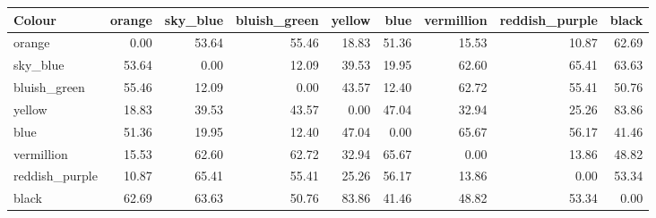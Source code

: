 \begin{tabular}{lrrrrrrrr}
\toprule
Colour & orange & sky\_blue & bluish\_green & yellow & blue & vermillion & reddish\_purple & black \\
\midrule
orange & 0.00 & 53.64 & 55.46 & 18.83 & 51.36 & 15.53 & 10.87 & 62.69 \\
sky\_blue & 53.64 & 0.00 & 12.09 & 39.53 & 19.95 & 62.60 & 65.41 & 63.63 \\
bluish\_green & 55.46 & 12.09 & 0.00 & 43.57 & 12.40 & 62.72 & 55.41 & 50.76 \\
yellow & 18.83 & 39.53 & 43.57 & 0.00 & 47.04 & 32.94 & 25.26 & 83.86 \\
blue & 51.36 & 19.95 & 12.40 & 47.04 & 0.00 & 65.67 & 56.17 & 41.46 \\
vermillion & 15.53 & 62.60 & 62.72 & 32.94 & 65.67 & 0.00 & 13.86 & 48.82 \\
reddish\_purple & 10.87 & 65.41 & 55.41 & 25.26 & 56.17 & 13.86 & 0.00 & 53.34 \\
black & 62.69 & 63.63 & 50.76 & 83.86 & 41.46 & 48.82 & 53.34 & 0.00 \\
\bottomrule
\end{tabular}
